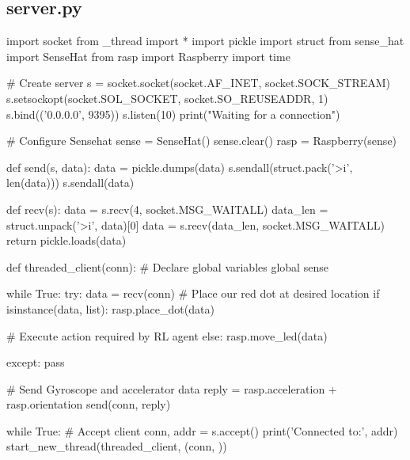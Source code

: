\subsection{server.py}
\label{server_code}
\begin{pyverbatim}
import socket
from _thread import *
import pickle
import struct
from sense_hat import SenseHat
from rasp import Raspberry
import time

# Create server
s = socket.socket(socket.AF_INET, socket.SOCK_STREAM)
s.setsockopt(socket.SOL_SOCKET, socket.SO_REUSEADDR, 1)
s.bind(('0.0.0.0', 9395))
s.listen(10)
print("Waiting for a connection")

# Configure Sensehat
sense = SenseHat()
sense.clear()
rasp = Raspberry(sense)

def send(s, data):
    data = pickle.dumps(data)
    s.sendall(struct.pack('>i', len(data)))
    s.sendall(data)

def recv(s):
    data = s.recv(4, socket.MSG_WAITALL)
    data_len = struct.unpack('>i', data)[0]
    data = s.recv(data_len, socket.MSG_WAITALL)
    return pickle.loads(data)

def threaded_client(conn):
    # Declare global variables
    global sense

    while True:
        try:
            data = recv(conn)
            # Place our red dot at desired location
            if isinstance(data, list):
                rasp.place_dot(data)

            # Execute action required by RL agent
            else:
                rasp.move_led(data)

        except:
            pass
        
        # Send Gyroscope and accelerator data
        reply = rasp.acceleration + rasp.orientation
        send(conn, reply)

while True:
    # Accept client
    conn, addr = s.accept()
    print('Connected to:', addr)
    start_new_thread(threaded_client, (conn, ))
\end{pyverbatim}


